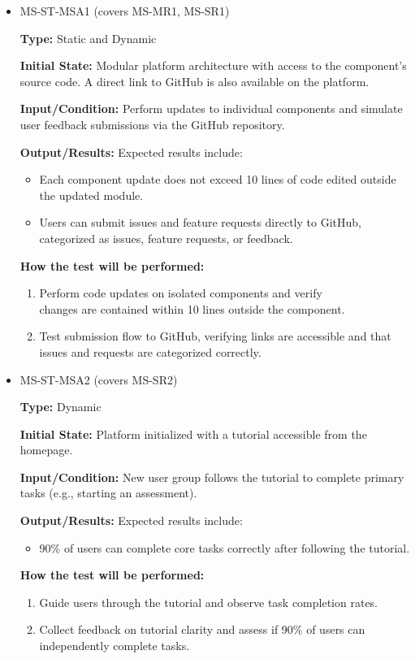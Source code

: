 \documentclass[12pt, titlepage]{article}
\begin{document}
\begin{itemize} 
  \item MS-ST-MSA1 (covers MS-MR1, MS-SR1)
  \begin{mdframed}[linewidth=0.5mm] 
    \textbf{Type:} Static and Dynamic \par 
    \textbf{Initial State:} Modular platform architecture with access to the component’s source code. A direct link to GitHub is also available on the platform. \par 
    \textbf{Input/Condition:} Perform updates to individual components and simulate user feedback submissions via the GitHub repository. \par 
    \textbf{Output/Results:} Expected results include: \begin{itemize} \item Each component update does not exceed 10 lines of code edited outside the updated module. 
      \item Users can submit issues and feature requests directly to GitHub, categorized as issues, feature requests, or feedback. 
    \end{itemize} \par 
    \textbf{How the test will be performed:} 
    \begin{enumerate}[noitemsep] 
      \item Perform code updates on isolated components and verify \\changes are contained within 10 lines outside the component. 
      \item Test submission flow to GitHub, verifying links are accessible and that issues and requests are categorized correctly. 
    \end{enumerate} 
  \end{mdframed}

  \item MS-ST-MSA2 (covers MS-SR2) 
  \begin{mdframed}[linewidth=0.5mm] 
    \textbf{Type:} Dynamic \par 
    \textbf{Initial State:} Platform initialized with a tutorial accessible from the homepage. \par 
    \textbf{Input/Condition:} New user group follows the tutorial to complete primary tasks (e.g., starting an assessment). \par 
    \textbf{Output/Results:} Expected results include: 
    \begin{itemize} 
      \item 90\% of users can complete core tasks correctly after following the tutorial. 
    \end{itemize} \par \textbf{How the test will be performed:} 
    \begin{enumerate}[noitemsep] 
      \item Guide users through the tutorial and observe task completion rates. 
      \item Collect feedback on tutorial clarity and assess if 90\% of users can independently complete tasks. 
    \end{enumerate} 
  \end{mdframed}


\end{itemize}
\end{document}
